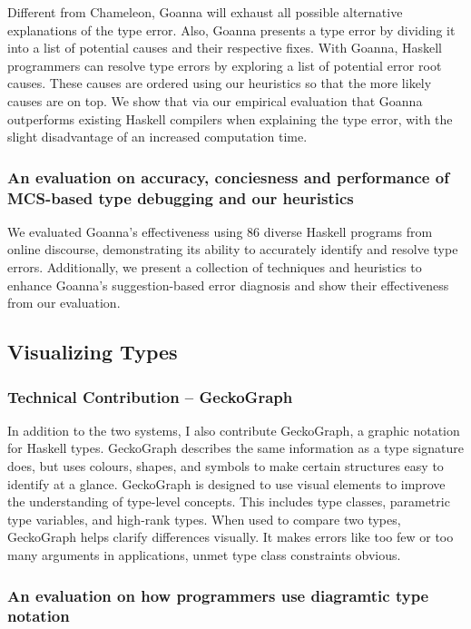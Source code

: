 Different from Chameleon, Goanna will exhaust all possible alternative explanations of the type error. Also, Goanna presents a type error by dividing it into a list of potential causes and their respective fixes. With Goanna, Haskell programmers can resolve type errors by exploring a list of potential error root causes. These causes are ordered using our heuristics so that the more likely causes are on top. We show that via our empirical evaluation that Goanna outperforms existing Haskell compilers when explaining the type error, with the slight disadvantage of an increased computation time.

\subsubsection{An evaluation on accuracy, conciesness and performance of MCS-based type debugging and our heuristics}

We evaluated Goanna's effectiveness using 86 diverse Haskell programs from online discourse, demonstrating its ability to accurately identify and resolve type errors. Additionally, we present a collection of techniques and heuristics to enhance Goanna's suggestion-based error diagnosis and show their effectiveness from our evaluation.


\subsection{Visualizing Types}

\subsubsection{Technical Contribution -- GeckoGraph}

In addition to the two systems, I also contribute GeckoGraph, a graphic notation for Haskell types. GeckoGraph describes the same information as a type signature does, but uses colours, shapes, and symbols to make certain structures easy to identify at a glance. GeckoGraph is designed to use visual elements to improve the understanding of type-level concepts. This includes type classes, parametric type variables, and high-rank types. When used to compare two types, GeckoGraph helps clarify differences visually. It makes errors like too few or too many arguments in applications, unmet type class constraints obvious.

\subsubsection{An evaluation on how programmers use diagramtic type notation}

